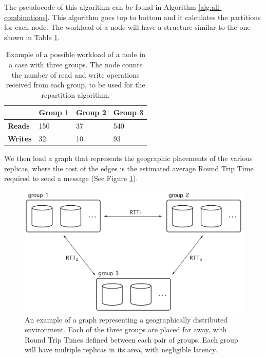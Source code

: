 The pseudocode of this algorithm can be found in Algorithm \ref{alg:all-combinations}. This algorithm goes top to bottom and it calculates the partitions for each node. The workload of a node will have a structure similar to the one shown in Table \ref{tab:workload-example}.

\begin{table}[!htb]
  \centering
  \begin{tabular}{l l l l}
    \hline
    & \textbf{Group 1} & \textbf{Group 2} & \textbf{Group 3} \\
    \hline
    \textbf{Reads} & 150 & 37 & 540 \\
    \textbf{Writes} & 32 & 10 & 93 \\
    \hline
  \end{tabular}
  \caption{Example of a possible workload of a node in a case with three groups. The node counts the number of read and write operations received from each group, to be used for the repartition algorithm.}\label{tab:workload-example}
\end{table}

We then load a graph that represents the geographic placements of the various replicas, where the cost of the edges is the estimated average Round Trip Time required to send a message (See Figure \ref{fig:graph}).

\begin{figure}[!htb]
  \centering
  \includegraphics[width=\textwidth,height=\textheight,keepaspectratio]{img/graph.png}
  \caption[caption]{An example of a graph representing a geographically distributed environment. Each of the three groups are placed far away, with Round Trip Times defined between each pair of groups. Each group will have multiple replicas in its area, with negligible latency.}
  \label{fig:graph}
\end{figure}

